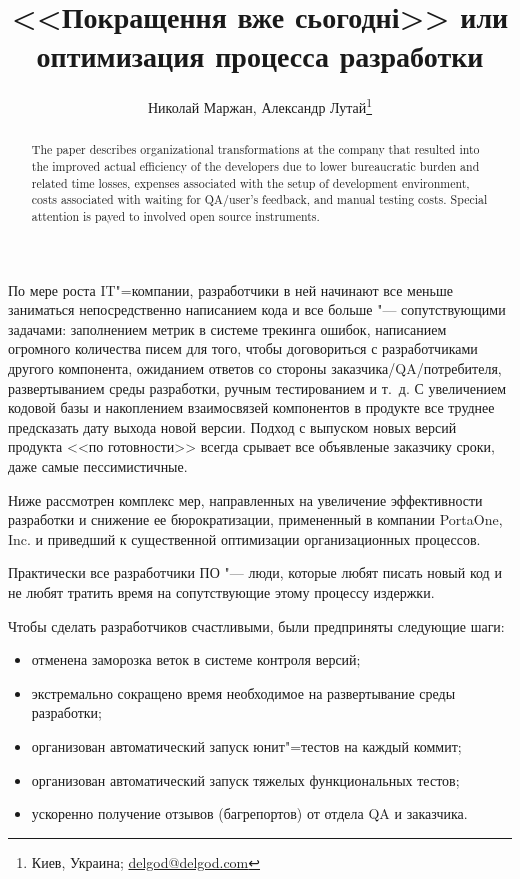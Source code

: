 \documentclass[10pt, a5paper]{article}
\begin{document}
\title{<<Покращення вже сьогодні>> или оптимизация процесса разработки}%

\author{Николай Маржан, Александр Лутай\footnote{Киев, Украина; \url{delgod@delgod.com}}}
\maketitle

\begin{abstract}
The paper describes organizational transformations at the company that resulted into the improved actual efficiency of the developers due to lower bureaucratic burden and related time losses, expenses associated with the setup of development environment, costs associated with waiting for QA/user’s feedback, and manual testing costs. Special attention is payed to involved open source instruments.
\end{abstract}

По мере роста IT"=компании, разработчики в ней начинают все меньше  заниматься непосредственно написанием кода и все больше "--- сопутствующими задачами: заполнением метрик в системе трекинга ошибок, написанием огромного количества писем для того, чтобы договориться с разработчиками другого компонента, ожиданием ответов со стороны заказчика/QA/потребителя, развертыванием среды разработки, ручным тестированием и т.~д. С увеличением кодовой базы и накоплением взаимосвязей компонентов в продукте все труднее предсказать дату выхода новой версии. Подход с выпуском новых версий продукта <<по готовности>> всегда срывает все объявленые заказчику сроки, даже самые пессимистичные.

Ниже рассмотрен комплекс мер, направленных на увеличение эффективности разработки и снижение ее бюрократизации, примененный в компании PortaOne, Inc. и приведший к существенной оптимизации организационных процессов.

Практически все разработчики ПО "--- люди, которые любят писать новый код и не любят тратить время на сопутствующие этому процессу издержки.

Чтобы сделать разработчиков счастливыми, были предприняты следующие шаги:

\begin{itemize}
  \item отменена заморозка веток в системе контроля версий;
  \item экстремально сокращено время необходимое на развертывание среды разработки;
  \item организован автоматический запуск юнит"=тестов на каждый коммит;
  \item организован автоматический запуск тяжелых функциональных тестов;
  \item ускоренно получение отзывов (багрепортов) от отдела QA и заказчика.
\end{itemize}
\end{document}
